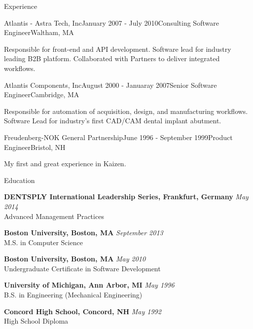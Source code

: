 \documentclass{resume}
\begin{document}
\begin{rSection}{Experience}
\begin{rSubsection}{Atlantis - Astra Tech, Inc}{January 2007 - July 2010}{Consulting Software Engineer}{Waltham, MA}
\item Responsible for front-end and API development. Software lead for industry leading B2B platform. Collaborated with Partners to deliver integrated workflows.
\end{rSubsection}


\begin{rSubsection}{Atlantis Components, Inc}{August 2000 - Januaray 2007}{Senior Software Engineer}{Cambridge, MA}
\item Responsible for automation of acquisition, design, and manufacturing workflows. Software Lead for industry's first CAD/CAM dental implant abutment.
\end{rSubsection}


\begin{rSubsection}{Freudenberg-NOK General Partnership}{June 1996 - September 1999}{Product Engineer}{Bristol, NH}
\item My first and great experience in Kaizen.
\end{rSubsection}

\end{rSection}

\begin{rSection}{Education}

\item {\bf DENTSPLY International Leadership Series, Frankfurt, Germany} \hfill {\em May 2014} \\
Advanced Management Practices

\item {\bf Boston University, Boston, MA} \hfill {\em September 2013} \\
M.S. in Computer Science

\item {\bf Boston University, Boston, MA} \hfill {\em May 2010} \\
Undergraduate Certificate in Software Development

\item {\bf University of Michigan, Ann Arbor, MI} \hfill {\em May 1996} \\
B.S. in Engineering (Mechanical Engineering)

\item {\bf Concord High School, Concord, NH} \hfill {\em May 1992} \\
High School Diploma

\end{rSection}
\end{document}
